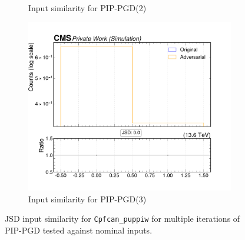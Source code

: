\begin{figure}[htbp]
\begin{subfigure}[t]{0.32\textwidth}
    \caption*{Input similarity for PIP-PGD(2)}
  \end{subfigure}\hfill
  \begin{subfigure}[t]{0.32\textwidth}
    \includegraphics[width=\linewidth]{media/output/features/compare/combined_it_3/cmp_cpf_arr_Cpfcan_puppiw.pdf}
    \caption*{Input similarity for PIP-PGD(3)}
  \end{subfigure}

  \caption*{JSD input similarity for \texttt{Cpfcan\_puppiw} for multiple iterations of PIP-PGD tested against nominal inputs.}
  \label{fig:combined_input_Cpfcan_puppiw}
\end{figure}


